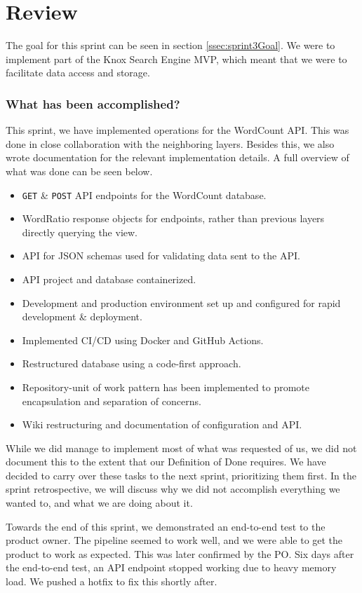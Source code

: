 \section{Review}
The goal for this sprint can be seen in section \ref{ssec:sprint3Goal}. We were to implement part of the Knox Search Engine MVP, which meant that we were to facilitate data access and storage.

\subsubsection{What has been accomplished?}
This sprint, we have implemented operations for the WordCount API. This was done in close collaboration with the neighboring layers. 
Besides this, we also wrote documentation for the relevant implementation details. A full overview of what was done can be seen below.

\begin{itemize}
    \item \texttt{GET} \& \texttt{POST} API endpoints for the WordCount database.
    \item WordRatio response objects for endpoints, rather than previous layers directly querying the view.
    \item API for JSON schemas used for validating data sent to the API.
    \item API project and database containerized.
    \item Development and production environment set up and configured for rapid development \& deployment.
    \item Implemented CI/CD using Docker and GitHub Actions.
    \item Restructured database using a code-first approach.
    \item Repository-unit of work pattern has been implemented to promote encapsulation and separation of concerns.
    \item Wiki restructuring and documentation of configuration and API.
\end{itemize}

While we did manage to implement most of what was requested of us, we did not document this to the extent that our Definition of Done requires. 
We have decided to carry over these tasks to the next sprint, prioritizing them first. In the sprint retrospective, we will discuss why we did not accomplish everything we wanted to, and what we are doing about it.

Towards the end of this sprint, we demonstrated an end-to-end test to the \knox{} product owner. The pipeline seemed to work well, and we were able to get the product to work as expected. This was later confirmed by the PO. 
Six days after the end-to-end test, an API endpoint stopped working due to heavy memory load. We pushed a hotfix to fix this shortly after.

